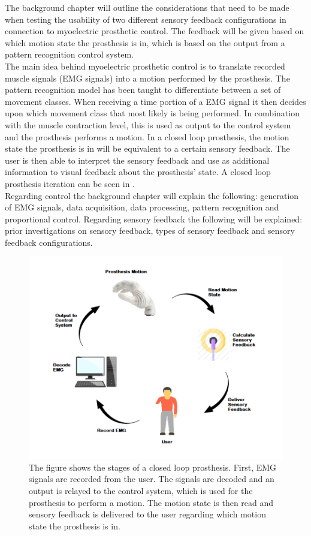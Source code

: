 The background chapter will outline the considerations that need to be made when testing the usability of two different sensory feedback configurations in connection to myoelectric prosthetic control. The feedback will be given based on which motion state the prosthesis is in, which is based on the output from a pattern recognition control system. \\
The main idea behind myoelectric prosthetic control is to translate recorded muscle signals (EMG signals) into a motion performed by the prosthesis. The pattern recognition model has been taught to differentiate between a set of movement classes. When receiving a time portion of a EMG signal it then decides upon which movement class that most likely is being performed. In combination with the muscle contraction level, this is used as output to the control system and the prosthesis performs a motion. In a closed loop prosthesis, the motion state the prosthesis is in will be equivalent to a certain sensory feedback. The user is then able to interpret the sensory feedback and use as additional information to visual feedback about the prosthesis' state. A closed loop prosthesis iteration can be seen in . \\
Regarding control the background chapter will explain the following: generation of EMG signals, data acquisition, data processing, pattern recognition and proportional control. Regarding sensory feedback the following will be explained: prior investigations on sensory feedback, types of sensory feedback and sensory feedback configurations. 

\begin{figure}[H]                 
	\includegraphics[width=.4\textwidth]{figures/closed_loop_pros}  
	\caption{The figure shows the stages of a closed loop prosthesis. First, EMG signals are recorded from the user. The signals are decoded and an output is relayed to the control system, which is used for the prosthesis to perform a motion. The motion state is then read and sensory feedback is delivered to the user regarding which motion state the prosthesis is in.}
	\label{fig:closed_loop_pros} 
\end{figure}